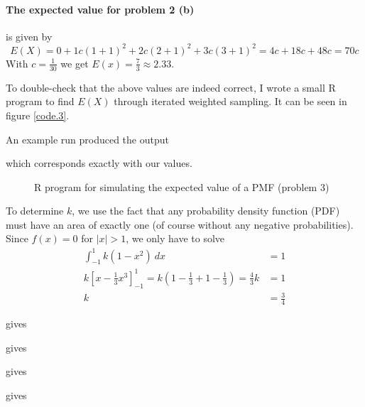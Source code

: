 \documentclass[a4paper,english,12pt]{article}
\begin{document}
\paragraph{The expected value for problem 2 (b)} is given by
\[
  E(X) =
    0 +
    1 c(1+1)^2 +
    2 c(2+1)^2 +
    3 c(3+1)^2 =
    4c + 18c + 48c = 70c
\]
With $c=\frac{1}{30}$ we get $E(x) = \frac{7}{3} \approx 2.33$.

To double-check that the above values are indeed correct, I wrote a small R
program to find $E(X)$ through iterated weighted sampling. It can be seen in
figure \vref{code.3}.

An example run produced the output

which corresponds exactly with our values.

\begin{figure}[t]
  
  \caption{R program for simulating the expected value of a PMF (problem 3)}
  \label{code.3}
\end{figure}



To determine $k$, we use the fact that any probability density function (PDF)
must have an area of exactly one (of course without any negative
probabilities). Since $f(x) = 0$ for $|x| > 1$, we only have to solve
\begin{align*}
  \int_{-1}^{1}{k(1-x^2)~dx} &= 1 \\
  k\left[ x - \frac{1}{3}{x^3} \right]_{-1}^{1} =
  k\left( 1 - \frac{1}{3} + 1 - \frac{1}{3} \right) = \frac{4}{3}k &= 1 \\
   k &= \frac{3}{4}
\end{align*}






\texttt{} gives
\texttt{}

\texttt{} gives
\texttt{}

 gives
\texttt{}

\texttt{} gives
\texttt{}

\end{document}
